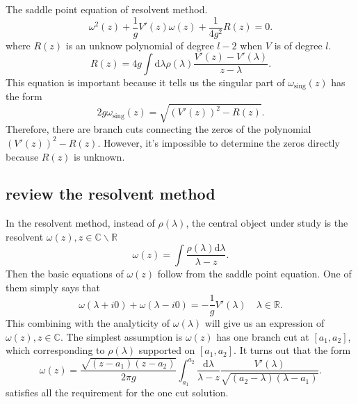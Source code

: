 The saddle point equation of resolvent method.
\begin{equation}
	\omega^2(z) + \frac{1}{g} V'(z) \omega(z)
	+ \frac{1}{4g^2} R(z) = 0
.\end{equation}
where $R(z)$ is an unknow polynomial of degree $l-2$ when $V$ is of degree $l$.
\begin{equation*}
	R(z) = 4g \int \mathrm{d}\lambda \rho(\lambda) \frac{V'(z)-V'(\lambda)}{z-\lambda}
.\end{equation*}
This equation is important because it tells us the singular part of $\omega_{\text{sing}}(z)$ has the form
\[
	2g\omega_{\text{sing}}(z) = \sqrt{(V'(z))^2 - R(z)}
.\]
Therefore, there are branch cuts connecting the zeros of the polynomial $(V'(z))^2-R(z)$.
However, it's impossible to determine the zeros directly because $R(z)$ is unknown.

\subsection{review the resolvent method}

In the resolvent method, instead of $\rho(\lambda)$, the central object under study is the resolvent $\omega(z),z\in \mathbb{C}\backslash\mathbb{R}$
\[
	\omega(z) = \int \frac{\rho(\lambda){\mathrm{d}\lambda}}{\lambda-z}
.\]
Then the basic equations of $\omega(z)$ follow from the saddle point equation.
One of them simply says that
\begin{equation}
	\omega(\lambda+i0) + \omega(\lambda-i0) = -\frac{1}{g} V'(\lambda) \quad \lambda\in\mathbb{R}
.\end{equation}
This combining with the analyticity of $\omega(\lambda)$ will give us an expression of $\omega(z),z\in\mathbb{C}$.
The simplest assumption is $\omega(z)$ has one branch cut at $[a_1,a_2]$,
which corresponding to $\rho(\lambda)$ supported on $[a_1,a_2]$.
It turns out that the form
\[
	\omega(z) = \frac{\sqrt{(z-a_1)(z-a_2)}}{2\pi g} \int_{a_1}^{a_2} \frac{\mathrm{d}\lambda}{\lambda - z}\frac{V'(\lambda)}{\sqrt{(a_2-\lambda)(\lambda-a_1)}}
.\]
satisfies all the requirement for the one cut solution.

